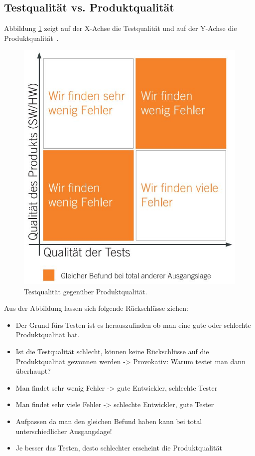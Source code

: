 \subsection{Testqualität vs. Produktqualität}
Abbildung \ref{fig: Testqualität vs. Produktqualität} zeigt auf der X-Achse die Testqualität und auf der Y-Achse die Produktqualität~\cite{theNoserWayOfTesting}.

\begin{figure}[H]
	\centering
	\includegraphics[width=0.6\columnwidth]{01/bilder/Testqualität vs Produktqualität.JPG}
	\caption{Testqualität gegenüber Produktqualität.}
	\label{fig: Testqualität vs. Produktqualität}
\end{figure}

Aus der Abbildung lassen sich folgende Rückschlüsse ziehen:
\begin{itemize}
    \item Der Grund fürs Testen ist es herauszufinden ob man eine gute oder schlechte Produktqualität hat.
    \item Ist die Testqualität schlecht, können keine Rückschlüsse auf die Produktqualität gewonnen werden -> Provokativ: Warum testet man dann überhaupt?
    \item Man findet sehr wenig Fehler -> gute Entwickler, schlechte Tester
    \item Man findet sehr viele Fehler -> schlechte Entwickler, gute Tester
    \item Aufpassen da man den gleichen Befund haben kann bei total unterschiedlicher Ausgangslage!
    \item Je besser das Testen, desto schlechter erscheint die Produktqualität
\end{itemize}

